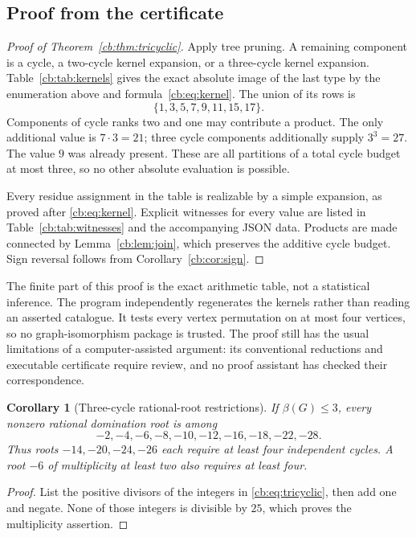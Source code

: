 \documentclass[11pt]{article}
\numberwithin{equation}{section}
\newtheorem{corollary}[theorem]{Corollary}
\theoremstyle{definition}
\begin{document}
\subsection{Proof from the certificate}
\begin{proof}[Proof of Theorem~\ref{cb:thm:tricyclic}]
Apply tree pruning. A remaining component is a cycle, a two-cycle kernel
expansion, or a three-cycle kernel expansion. Table~\ref{cb:tab:kernels}
gives the exact absolute image of the last type by the enumeration above
and formula~\eqref{cb:eq:kernel}. The union of its rows is
\[
 \{1,3,5,7,9,11,15,17\}.
\]
Components of cycle ranks two and one may contribute a product. The
only additional value is $7\cdot3=21$; three cycle components additionally
supply $3^3=27$. The value $9$ was already present. These are all partitions
of a total cycle budget at most three, so no other absolute evaluation is
possible.

Every residue assignment in the table is realizable by a simple expansion,
as proved after \eqref{cb:eq:kernel}. Explicit witnesses for every value are
listed in Table~\ref{cb:tab:witnesses} and the accompanying JSON data. Products
are made connected by Lemma~\ref{cb:lem:join}, which preserves the additive
cycle budget. Sign reversal follows from Corollary~\ref{cb:cor:sign}.
\end{proof}

The finite part of this proof is the exact arithmetic table, not a
statistical inference. The program independently regenerates the kernels
rather than reading an asserted catalogue. It tests every vertex permutation
on at most four vertices, so no graph-isomorphism package is trusted.
The proof still has the usual limitations of a computer-assisted argument:
its conventional reductions and executable certificate require review, and
no proof assistant has checked their correspondence.

\begin{corollary}[Three-cycle rational-root restrictions]\label{cb:cor:triroots}
If $\beta(G)\le3$, every nonzero rational domination root is among
\[
 -2,-4,-6,-8,-10,-12,-16,-18,-22,-28.
\]
Thus roots $-14,-20,-24,-26$ each require at least four independent cycles.
A root $-6$ of multiplicity at least two also requires at least four.
\end{corollary}
\begin{proof}
List the positive divisors of the integers in \eqref{cb:eq:tricyclic}, then
add one and negate. None of those integers is divisible by $25$, which
proves the multiplicity assertion.
\end{proof}
\end{document}
